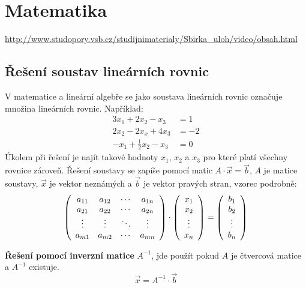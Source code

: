 \section{Matematika}
\url{http://www.studopory.vsb.cz/studijnimaterialy/Sbirka_uloh/video/obsah.html}
\subsection{Řešení soustav lineárních rovnic}
V matematice a lineární algebře se jako soustava lineárních rovnic označuje množina lineárních rovnic. Například:
\begin{equation}
\begin{aligned}
	3x_1 + 2x_2 - x_3 &= 1 \\
	2x_2 - 2x_x + 4x_3 &= -2 \\
	-x_1+\frac{1}{2}x_2-x_3 &=0
\end{aligned}
\end{equation}
\noindent Úkolem při řešení je najít takové hodnoty $x_1$, $x_2$ a $x_3$ pro které platí všechny rovnice zároveň.
Řešení soustavy se zapíše pomocí matic $A\cdot \vec{x} = \vec{b}$, $A$ je matice soustavy, $\vec{x}$ je vektor neznámých a $\vec{b}$ je vektor pravých stran, vzorec podrobně:
\begin{equation}
\left(
\begin{array}{c c c c}
a_{11} & a_{12} & \cdots & a_{1n}\\
a_{21} & a_{22} & \cdots & a_{2n}\\
\vdots & \vdots & \ddots & \vdots\\
a_{m1} & a_{m2} & \cdots & a_{mn}\\
\end{array}
\right)
\cdot
\left(
\begin{array}{c}
x_1\\
x_2\\
\vdots \\
x_n
\end{array}
\right)
=
\left(
\begin{array}{c}
b_1\\
b_2\\
\vdots \\
b_n
\end{array}
\right)
\end{equation}

\textbf{Řešení pomocí inverzní matice} $A^{-1}$, jde použít pokud $A$ je čtvercová matice a $A^{-1}$ existuje.
\begin{equation}
\vec{x} = A^{-1}\cdot \vec{b}
\end{equation}

